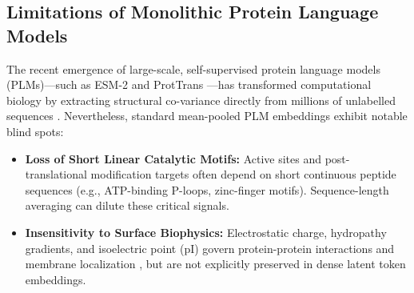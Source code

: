 \documentclass[twocolumn,10pt]{article}
\begin{document}
\subsection{Limitations of Monolithic Protein Language Models}
The recent emergence of large-scale, self-supervised protein language models (PLMs)---such as ESM-2 \cite{lin2023evolutionary} and ProtTrans \cite{elnaggar2021prottrans}---has transformed computational biology by extracting structural co-variance directly from millions of unlabelled sequences \cite{rives2021biological}. Nevertheless, standard mean-pooled PLM embeddings exhibit notable blind spots:
\begin{itemize}
    \item \textbf{Loss of Short Linear Catalytic Motifs:} Active sites and post-translational modification targets often depend on short continuous peptide sequences (e.g., ATP-binding P-loops, zinc-finger motifs). Sequence-length averaging can dilute these critical signals.
    \item \textbf{Insensitivity to Surface Biophysics:} Electrostatic charge, hydropathy gradients, and isoelectric point ($\text{pI}$) govern protein-protein interactions and membrane localization \cite{kulmanov2018deepgoplus}, but are not explicitly preserved in dense latent token embeddings.
\end{itemize}
\end{document}
